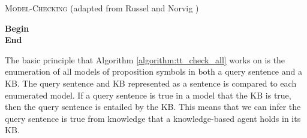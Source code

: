\vspace{0.2cm}
\begin{algorithm}[H]
\label{algorithm:tt_check_all}
\caption{\textsc{Model-Checking} (adapted from Russel and Norvig \citep{russell2016artificial})}
\SetAlgoLined
\DontPrintSemicolon
{}
\textbf{Begin} \\
\Indm 
\textbf{End} 
\end{algorithm}
\vspace{0.5cm}


The basic principle that Algorithm \ref{algorithm:tt_check_all} works on is the enumeration of all models of proposition symbols in both a query sentence and a KB. The query sentence and KB represented as a sentence is compared to each enumerated model. If a query sentence is true in a model that the KB is true, then the query sentence is entailed by the KB. This means that we can infer the query sentence is true from knowledge that a knowledge-based agent holds in its KB.

